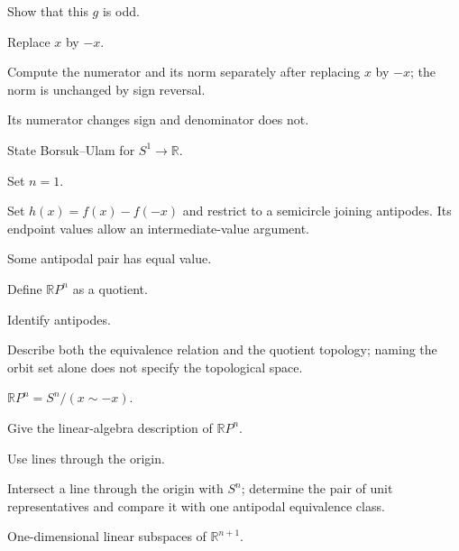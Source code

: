 \begin{exercise}\label{exr:viii04-09}
Show that this \(g\) is odd.
\end{exercise}
\begin{hint}
Replace \(x\) by \(-x\).

Compute the numerator and its norm separately after replacing \(x\) by \(-x\); the norm is unchanged by sign reversal.
\end{hint}
\begin{solution}
Its numerator changes sign and denominator does not.
\end{solution}

\begin{exercise}\label{exr:viii04-10}
State Borsuk--Ulam for \(S^1\to\mathbb R\).
\end{exercise}
\begin{hint}
Set \(n=1\).

Set \(h(x)=f(x)-f(-x)\) and restrict to a semicircle joining antipodes. Its endpoint values allow an intermediate-value argument.
\end{hint}
\begin{solution}
Some antipodal pair has equal value.
\end{solution}

\begin{exercise}\label{exr:viii04-11}
Define \(\mathbb RP^n\) as a quotient.
\end{exercise}
\begin{hint}
Identify antipodes.

Describe both the equivalence relation and the quotient topology; naming the orbit set alone does not specify the topological space.
\end{hint}
\begin{solution}
\(\mathbb RP^n=S^n/(x\sim -x)\).
\end{solution}

\begin{exercise}\label{exr:viii04-12}
Give the linear-algebra description of \(\mathbb RP^n\).
\end{exercise}
\begin{hint}
Use lines through the origin.

Intersect a line through the origin with \(S^n\); determine the pair of unit representatives and compare it with one antipodal equivalence class.
\end{hint}
\begin{solution}
One-dimensional linear subspaces of \(\mathbb R^{n+1}\).
\end{solution}

